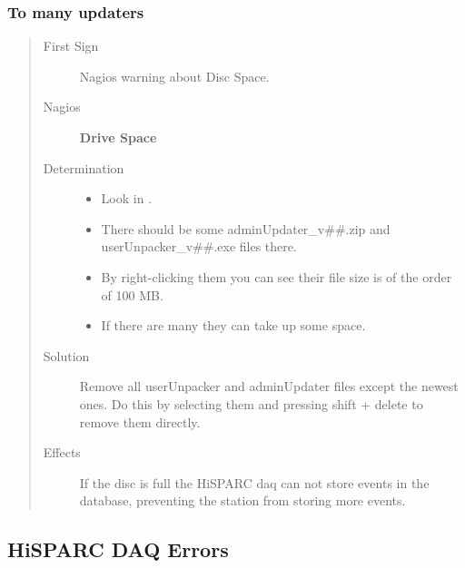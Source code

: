 \documentclass[a4paper,11pt,english]{sphinxmanual}
\begin{document}
\subsubsection{To many updaters}
\label{known-issues:to-many-updaters}\begin{quote}\begin{description}
\item[{First Sign}] \leavevmode
Nagios warning about Disc Space.

\item[{Nagios}] \leavevmode
\textbf{Drive Space}

\item[{Determination}] \leavevmode\begin{itemize}
\item {} 
Look in .

\item {} 
There should be some adminUpdater\_v\#\#.zip and
userUnpacker\_v\#\#.exe files there.

\item {} 
By right-clicking them you can see their file size is of the order
of 100 MB.

\item {} 
If there are many they can take up some space.

\end{itemize}

\item[{Solution}] \leavevmode
Remove all userUnpacker and adminUpdater files except the
newest ones. Do this by selecting them and pressing shift +
delete to remove them directly.

\item[{Effects}] \leavevmode
If the disc is full the HiSPARC daq can not store events in
the database, preventing the station from storing more events.

\end{description}\end{quote}


\subsection{HiSPARC DAQ Errors}
\label{known-issues:hisparc-daq-errors}
\end{document}
